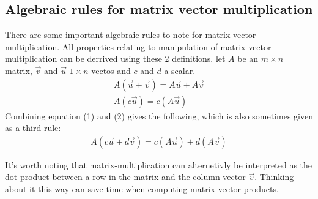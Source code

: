 \documentclass[11pt, a4paper]{article}
\begin{document}
\subsection{Algebraic rules for matrix vector multiplication}
There are some important algebraic rules to note for matrix-vector multiplication. All properties
relating to manipulation of matrix-vector multiplication can be derrived using these 2 definitions.
let $A$ be an $m \times n$ matrix, $\vec{v}$ and $\vec{u}$ $1 \times n$ vectos and $c$ and $d$ a scalar.
\begin{gather}
  A(\vec{u} + \vec{v}) = A\vec{u} + A\vec{v}\\
  A(c\vec{u}) = c(A\vec{u})
\end{gather}
Combining equation (1) and (2) gives the following, which is also sometimes given as a third rule:
\begin{gather}
  A(c\vec{u} + d\vec{v}) = c(A\vec{u}) + d(A\vec{v})
\end{gather}

It's worth noting that matrix-multiplication can alternetivly be interpreted as the dot product
between a row in the matrix and the column vector $\vec{v}$. Thinking about it this way can save time
when computing matrix-vector products.
\end{document}
